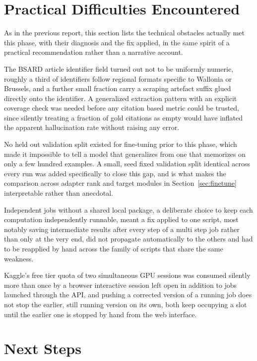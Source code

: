 \documentclass[11pt, a4paper]{article}
\begin{document}
\section{Practical Difficulties Encountered}

As in the previous report, this section lists the technical obstacles actually met this phase, with their diagnosis and the fix applied, in the same spirit of a practical recommendation rather than a narrative account.

The BSARD article identifier field turned out not to be uniformly numeric, roughly a third of identifiers follow regional formats specific to Wallonia or Brussels, and a further small fraction carry a scraping artefact suffix glued directly onto the identifier. A generalized extraction pattern with an explicit coverage check was needed before any citation based metric could be trusted, since silently treating a fraction of gold citations as empty would have inflated the apparent hallucination rate without raising any error.

No held out validation split existed for fine-tuning prior to this phase, which made it impossible to tell a model that generalizes from one that memorizes on only a few hundred examples. A small, seed fixed validation split identical across every run was added specifically to close this gap, and is what makes the comparison across adapter rank and target modules in Section~\ref{sec:finetune} interpretable rather than anecdotal.

Independent jobs without a shared local package, a deliberate choice to keep each computation independently runnable, meant a fix applied to one script, most notably saving intermediate results after every step of a multi step job rather than only at the very end, did not propagate automatically to the others and had to be reapplied by hand across the family of scripts that share the same weakness.

Kaggle's free tier quota of two simultaneous GPU sessions was consumed silently more than once by a browser interactive session left open in addition to jobs launched through the API, and pushing a corrected version of a running job does not stop the earlier, still running version on its own, both keep occupying a slot until the earlier one is stopped by hand from the web interface.

\section{Next Steps}
\end{document}

